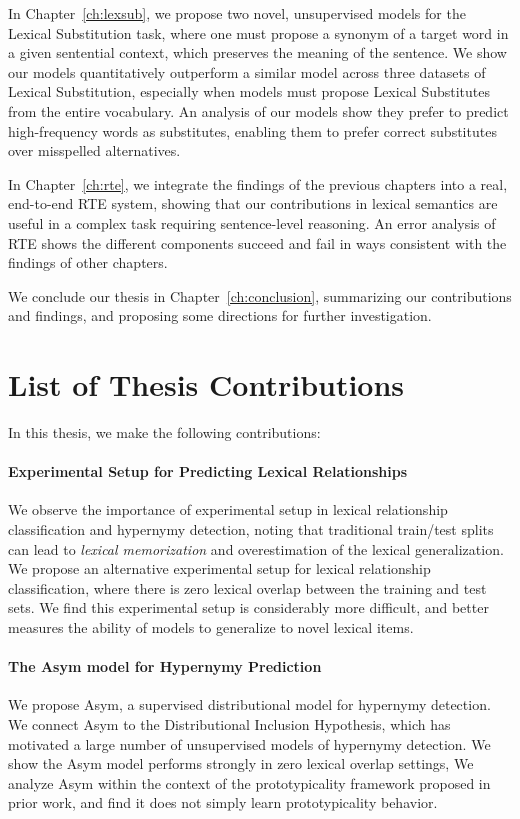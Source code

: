 In Chapter~\ref{ch:lexsub}, we propose two novel, unsupervised models for
the Lexical Substitution task, where one must propose a synonym of a target word in a given
    sentential context, which preserves the meaning of the sentence. We show our models quantitatively outperform
a similar model across three datasets of Lexical Substitution, especially
when models must propose Lexical Substitutes from the entire vocabulary.
An analysis of our models show they prefer to predict high-frequency words
as substitutes, enabling them to prefer correct substitutes over
misspelled alternatives.

In Chapter~\ref{ch:rte}, we integrate the findings of the previous chapters
into a real, end-to-end RTE system, showing that our contributions in lexical
semantics are useful in a complex task requiring sentence-level reasoning.
An error analysis of RTE shows the different components succeed and fail
in ways consistent with the findings of other chapters.

We conclude our thesis in Chapter~\ref{ch:conclusion}, summarizing our
contributions and findings, and proposing some directions for further
investigation.


\section{List of Thesis Contributions}

\noindent In this thesis, we make the following contributions:

\paragraph{Experimental Setup for Predicting Lexical Relationships}
We observe the importance of experimental setup in lexical relationship
    classification and hypernymy detection, noting that traditional train/test
    splits can lead to {\em lexical memorization} and overestimation of the
    lexical generalization.
We propose an alternative experimental setup for lexical relationship
    classification, where there is zero lexical overlap between the training
    and test sets. We find this experimental setup is considerably more
    difficult, and better measures the ability of models to generalize to
    novel lexical items.

\paragraph{The Asym model for Hypernymy Prediction}
We propose Asym, a supervised distributional model for hypernymy
    detection. We connect Asym to the Distributional Inclusion Hypothesis, which
    has motivated a large number of unsupervised models of hypernymy detection.
    We show the Asym model performs strongly in zero lexical overlap settings,
We analyze Asym within the context of the prototypicality framework
    proposed in prior work, and find it does not simply learn prototypicality
    behavior.

